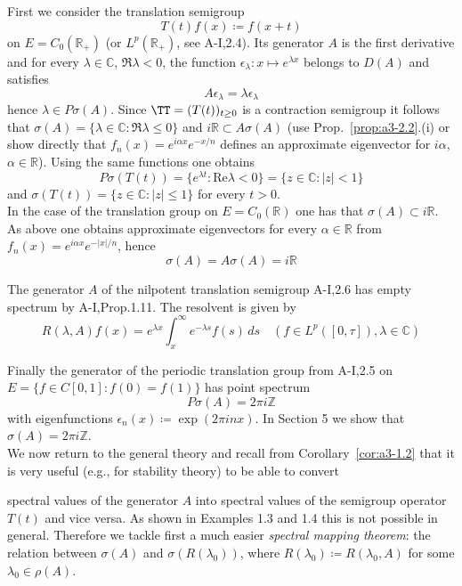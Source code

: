 First we consider the translation semigroup
\[
T(t)f(x) \coloneqq f(x+t)
\]
on $E = C_{0}(\mathbb{R}_{+})$ (or $L^{p}(\mathbb{R}_{+})$, see A-I,2.4).
Its generator $A$ is the first derivative and for every $\lambda \in \mathbb{C}$, $\Re\lambda < 0$, the function $\epsilon_{\lambda} \colon x \mapsto e^{\lambda x}$ belongs to $D(A)$ and satisfies
\[
A\epsilon_{\lambda} = \lambda\epsilon_{\lambda}
\]
hence $\lambda \in P\sigma(A)$.
Since $\TT = (T(t))_{t \geq 0}$ is a contraction semigroup it follows that $\sigma(A) = \{\lambda \in \mathbb{C} \colon \Re \lambda \leq 0\}$ and $i\mathbb{R} \subset A\sigma(A)$ (use Prop.~\ref{prop:a3-2.2}.(i) or show directly that $f_{n}(x) = e^{i\alpha x}e^{-x/n}$ defines an approximate eigenvector for $i\alpha$, $\alpha \in \mathbb{R}$).
Using the same functions one obtains
\[
P\sigma(T(t)) = \{e^{\lambda t} \colon \text{Re}\lambda < 0\} = \{z \in \mathbb{C} \colon |z| < 1\}
\]
and $\sigma(T(t)) = \{z \in \mathbb{C} \colon |z| \leq 1\}$ for every $t > 0$.
\\

In the case of the translation group on $E = C_{0}(\mathbb{R})$ one has that $\sigma(A) \subset i\mathbb{R}$.
As above one obtains approximate eigenvectors for every $\alpha \in \mathbb{R}$ from $f_{n}(x) = e^{i\alpha x}e^{-|x|/n}$, hence
\[
\sigma(A) = A\sigma(A) = i\mathbb{R}
\]

The generator $A$ of the nilpotent translation semigroup A-I,2.6 has empty spectrum by A-I,Prop.1.11.
The resolvent is given by
\[
R(\lambda,A)f(x) = e^{\lambda x}\int_{x}^{\infty}e^{-\lambda s}f(s) \, ds \quad (f \in L^{p}([0,\tau]), \lambda \in \mathbb{C})
\]

Finally the generator of the periodic translation group from A-I,2.5 on $E = \{f \in C[0,1] \colon f(0) = f(1)\}$ has point spectrum
\[
P\sigma(A) = 2\pi i\mathbb{Z}
\]
with eigenfunctions $\epsilon_{n}(x) \coloneqq \exp(2\pi inx)$.
In Section 5 we show that $\sigma(A) = 2\pi i\mathbb{Z}$.
\\

We now return to the general theory and recall from Corollary~\ref{cor:a3-1.2} that it is very useful (e.g., for stability theory) to be able to convert



\newpage
spectral values of the generator $A$ into spectral values of the semigroup operator $T(t)$ and vice versa.
As shown in Examples 1.3 and 1.4 this is not possible in general.
Therefore we tackle first a much easier \emph{spectral mapping theorem}: the relation between $\sigma(A)$ and $\sigma(R(\lambda_{0}))$, where $R(\lambda_{0}) \coloneqq R(\lambda_{0},A)$ for some $\lambda_{0} \in \rho(A)$.

